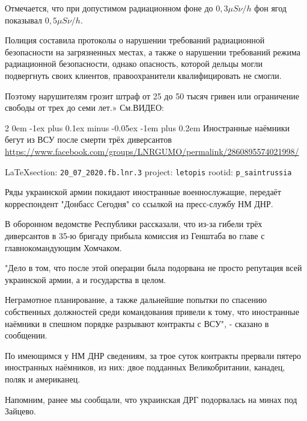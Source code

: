 \documentclass[a4paper,11pt]{extreport}
\makeatletter
\renewcommand\subsection{%
  \clearpage
    \@startsection{subsection}%
    {2}%
    {0em}%
    {-1ex plus 0.1ex minus -0.05ex}%
    {-1em plus 0.2em}%
    {\scshape\bfseries\Large}%
}
\makeatother
\begin{document}
Отмечается, что при допустимом радиационном фоне до $0,3 \mu S\nu/h$ фон ягод
показывал $0,5 \mu S\nu/h$.

Полиция составила протоколы о нарушении требований радиационной безопасности на
загрязненных местах, а также о нарушении требований режима радиационной
безопасности, однако опасность, которой дельцы могли подвергнуть своих
клиентов, правоохранители квалифицировать не смогли.

Поэтому нарушителям грозит штраф от 25 до 50 тысяч гривен или ограничение
свободы от трех до семи лет.» См.ВИДЕО:
 
 
\subsection{Иностранные наёмники бегут из ВСУ после смерти трёх диверсантов}
\label{sec:20_07_2020.fb.lnr.3}
\url{https://www.facebook.com/groups/LNRGUMO/permalink/2860895574021998/}
  
\vspace{0.5cm}
{\small\LaTeX section: \verb|20_07_2020.fb.lnr.3| project: \verb|letopis| rootid: \verb|p_saintrussia|}
\vspace{0.5cm}

Ряды украинской армии покидают иностранные военнослужащие, передаёт
корреспондент "Донбасс Сегодня" со ссылкой на пресс-службу НМ ДНР.

В оборонном ведомстве Республики рассказали, что из-за гибели трёх диверсантов
в 35-ю бригаду прибыла комиссия из Генштаба во главе с главнокомандующим
Хомчаком.

"Дело в том, что после этой операции была подорвана не просто репутация всей
украинской армии, а и государства в целом.

Неграмотное планирование, а также дальнейшие попытки по спасению собственных
должностей среди командования привели к тому, что иностранные наёмники в
спешном порядке разрывают контракты с ВСУ", - сказано в сообщении.

По имеющимся у НМ ДНР сведениям, за трое суток контракты прервали пятеро
иностранных наёмников, из них: двое подданных Великобритании, канадец, поляк и
американец.

Напомним, ранее мы сообщали, что украинская ДРГ подорвалась на минах под
Зайцево.
\end{document}

